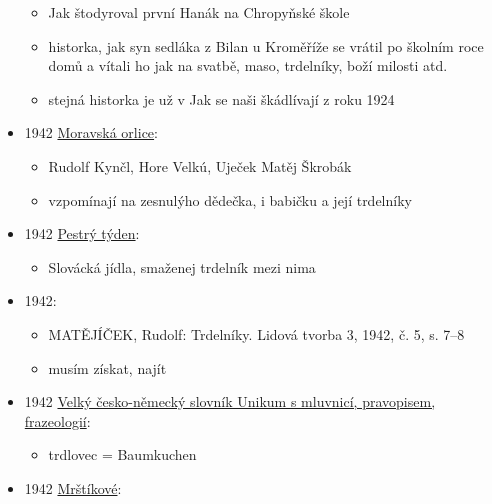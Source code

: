 \begin{itemize}
  \begin{itemize}
  \tightlist
  \item
    Jak štodyroval první Hanák na Chropyňské škole
  \item
    historka, jak syn sedláka z Bilan u Kroměříže se vrátil po školním
    roce domů a vítali ho jak na svatbě, maso, trdelníky, boží milosti
    atd.
  \item
    stejná historka je už v Jak se naši škádlívají z roku 1924
  \end{itemize}
\item
  1942
  \href{https://ceskadigitalniknihovna.cz/view/uuid:a493cef0-fea6-11de-81a7-000d606f5dc6?page=uuid:30eaf000-fac8-11de-9bea-000d606f5dc6&fulltext=trdeln\%C3\%AD*&source=mzk}{Moravská
  orlice}:

  \begin{itemize}
  \tightlist
  \item
    Rudolf Kynčl, Hore Velkú, Uječek Matěj Škrobák
  \item
    vzpomínají na zesnulýho dědečka, i babičku a její trdelníky
  \end{itemize}
\item
  1942
  \href{https://ceskadigitalniknihovna.cz/view/uuid:b2ec6826-435d-11dd-b505-00145e5790ea?page=uuid\%3A5f028ec9-435f-11dd-b505-00145e5790ea&fulltext=trdeln\%C3\%ADk\%20OR\%20trdeln\%C3\%ADky\%20OR\%20trdeln\%C3\%ADk\%C5\%AF&source=mzk}{Pestrý
  týden}:

  \begin{itemize}
  \tightlist
  \item
    Slovácká jídla, smaženej trdelník mezi nima
  \end{itemize}
\item
  1942:

  \begin{itemize}
  \tightlist
  \item
    MATĚJÍČEK, Rudolf: Trdelníky. Lidová tvorba 3, 1942, č. 5, s. 7--8
  \item
    musím získat, najít
  \end{itemize}
\item
  1942
  \href{https://ceskadigitalniknihovna.cz/uuid/uuid:086b8270-e420-11e8-a5a4-005056827e52}{Velký
  česko-německý slovník Unikum s mluvnicí, pravopisem, frazeologií}:

  \begin{itemize}
  \tightlist
  \item
    trdlovec = Baumkuchen
  \end{itemize}
\item
  1942
  \href{https://ceskadigitalniknihovna.cz/uuid/uuid:2c588580-119c-11e9-a03f-5ef3fc9bb22f}{Mrštíkové}:


\end{itemize}
